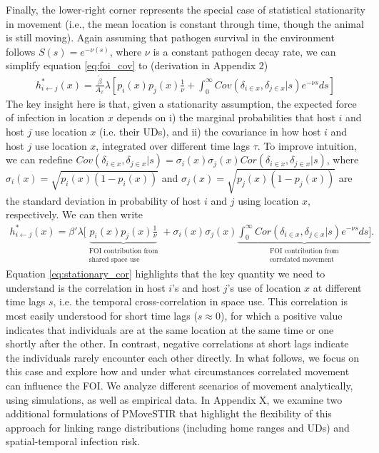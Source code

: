 \documentclass[letterpaper]{article}
\begin{document}
Finally, the lower-right corner represents the special case of statistical stationarity in movement (i.e., the mean location is constant through time, though the animal is still moving).
Again assuming that pathogen survival in the environment follows $S(s) = e^{-\nu (s)}$, where $\nu$ is a constant pathogen decay rate,  we can simplify equation \ref{eq:foi_cov} to (derivation in Appendix 2)
\begin{equation}
    \begin{aligned}
   h^*_{i \leftarrow j}(x) = \frac{\tilde{\beta}}{A_x} \lambda \left[p_i(x)p_j(x) \frac{1}{\nu} + \int_{0}^{\infty} Cov(\delta_{i \in x}, \delta_{j \in x} | s) e^{-\nu s} ds\right]
    \end{aligned}
    \label{eq:foi_stationary}
\end{equation}
The key insight here is that, given a stationarity assumption, the expected force of infection in location $x$ depends on i) the marginal probabilities that host $i$ and host $j$ use location $x$ (i.e. their UDs),  and ii) the covariance in how host $i$ and host $j$ use location $x$, integrated over different time lags $\tau$. 
To improve intuition, we can redefine $Cov(\delta_{i \in x}, \delta_{j \in x} | s) = \sigma_i(x) \sigma_j(x) Cor(\delta_{i \in x}, \delta_{j \in x} | s)$, where $\sigma_i(x) = \sqrt{p_i(x)(1 - p_i(x))}$  and $\sigma_j(x) = \sqrt{p_j(x)(1 - p_j(x))}$ are the standard deviation in probability of host $i$ and $j$ using location $x$, respectively.  We can then write
\begin{equation}
    \begin{aligned}
    h^*_{i \leftarrow j}(x) = \beta' \lambda [ \underbrace{p_i(x)p_j(x) \frac{1}{\nu}}_{\substack{\text{FOI contribution from} \\ \text{shared space use}}} + \sigma_i(x) \sigma_j(x) \underbrace{\int_{0}^{\infty} Cor(\delta_{i \in x}, \delta_{j \in x} | s) e^{-\nu s} ds]}_{\substack{\text{FOI contribution from} \\ \text{correlated movement}}}.
    \end{aligned}
    \label{eq:stationary_cor}
\end{equation}
Equation \ref{eq:stationary_cor} highlights that the key quantity we need to understand is the correlation in host $i$'s and host $j$'s use of location $x$ at different time lags $s$, i.e. the temporal cross-correlation in space use.
This correlation is most easily understood for short time lags ($s\approx0$), for which a positive value indicates that individuals are at the same location at the same time or one shortly after the other. In contrast, negative correlations at short lags indicate the individuals rarely encounter each other directly.
In what follows, we focus on this case and explore how and under what circumstances correlated movement can influence the FOI. We analyze different scenarios of movement analytically, using simulations, as well as empirical data.  In Appendix X, we examine two additional formulations of PMoveSTIR that highlight the flexibility of this approach for linking range distributions (including home ranges and UDs) and spatial-temporal infection risk.
\end{document}
